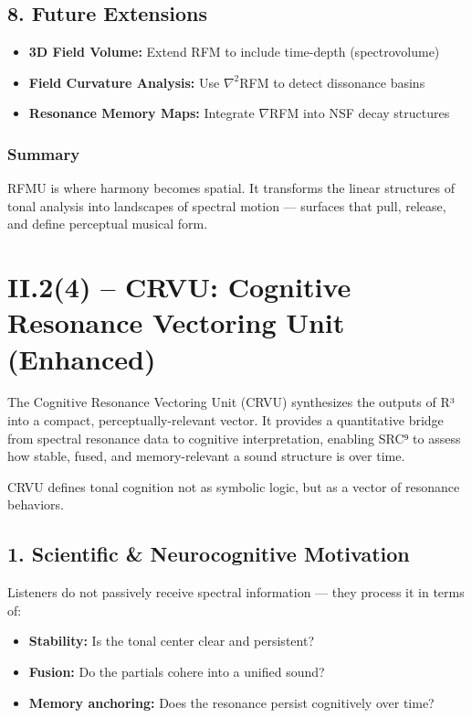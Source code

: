 \documentclass{article}
\begin{document}
\subsection*{8. Future Extensions}

\begin{itemize}
    \item \textbf{3D Field Volume:} Extend RFM to include time-depth (spectrovolume)
    \item \textbf{Field Curvature Analysis:} Use $\nabla^2$RFM to detect dissonance basins
    \item \textbf{Resonance Memory Maps:} Integrate $\nabla$RFM into NSF decay structures
\end{itemize}

\subsubsection*{Summary}

RFMU is where harmony becomes spatial. It transforms the linear structures of tonal analysis into landscapes of spectral motion — surfaces that pull, release, and define perceptual musical form.

\section*{II.2(4) – CRVU: Cognitive Resonance Vectoring Unit (Enhanced)}

The Cognitive Resonance Vectoring Unit (CRVU) synthesizes the outputs of R³ into a compact, perceptually-relevant vector. It provides a quantitative bridge from spectral resonance data to cognitive interpretation, enabling SRC⁹ to assess how stable, fused, and memory-relevant a sound structure is over time.

CRVU defines tonal cognition not as symbolic logic, but as a vector of resonance behaviors.

\subsection*{1. Scientific \& Neurocognitive Motivation}

Listeners do not passively receive spectral information — they process it in terms of:

\begin{itemize}
    \item \textbf{Stability:} Is the tonal center clear and persistent?
    \item \textbf{Fusion:} Do the partials cohere into a unified sound?
    \item \textbf{Memory anchoring:} Does the resonance persist cognitively over time?
\end{itemize}
\end{document}
